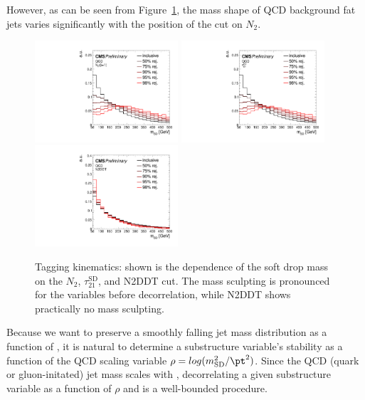 However, as can be seen from Figure~\ref{fig:taggingkinematics}, the mass shape of QCD background fat jets varies significantly with the position of the cut on $N_2$. 

\begin{figure}
  \centering
  \includegraphics[width=0.475\textwidth]{figures/higgstagging/QCDN2_mSD.pdf}
  \includegraphics[width=0.475\textwidth]{figures/higgstagging/QCDtau21SD_mSD.pdf}\\
  \includegraphics[width=0.475\textwidth]{figures/higgstagging/QCDN2DDT_mSD.pdf}\\
  \caption{Tagging kinematics: shown is the dependence of the soft drop mass on the $N_2$, $\tau_{21}^\text{SD}$, and N2DDT cut. The mass sculpting is pronounced for the variables before decorrelation, while N2DDT shows practically no mass sculpting.}
  \label{fig:taggingkinematics}
\end{figure}


Because we want to preserve a smoothly falling jet mass distribution as a function of \pt, it is natural to determine a substructure variable's stability as a function of the QCD scaling variable $\rho=log(m_{\text{SD}}^2/\pt^2)$.
Since the QCD (quark or gluon-initated) jet mass scales with \pt, decorrelating a given substructure variable as a function of $\rho$ and \pt is a well-bounded procedure.

